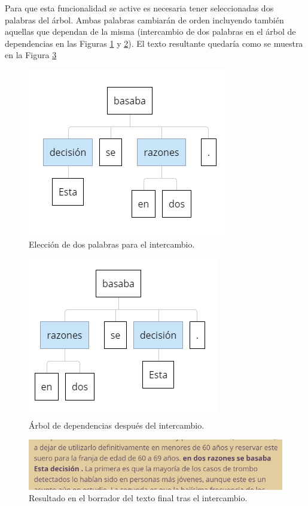 Para que esta funcionalidad se active es necesaria tener seleccionadas dos palabras del árbol. Ambas palabras cambiarán de orden incluyendo también aquellas que dependan de la misma (intercambio de dos palabras en el árbol de dependencias en las Figuras \ref{fig:eleccionIntercambio} y \ref{fig:intercambio}). El texto resultante quedaría como se muestra en la Figura \ref{fig:borradorIntercambio}
\begin{figure}[h!]
	\centering
	
	
	\includegraphics[scale=1]{Imagenes/Figuras/EleccionIntercambio}
	
	
	\caption{Elección de dos palabras para el intercambio.}
	\label{fig:eleccionIntercambio}
\end{figure}
\begin{figure}[h!]
	\centering
	
	
	\includegraphics[scale=1]{Imagenes/Figuras/IntercambioArbol}
	
	
	\caption{Árbol de dependencias después del intercambio.}
	\label{fig:intercambio}
\end{figure}
\begin{figure}[h!]
	\centering
	
	
	\includegraphics[scale=1]{Imagenes/Figuras/BorradorIntercambio}
	
	
	\caption{Resultado en el borrador del texto final tras el intercambio.}
	\label{fig:borradorIntercambio}
\end{figure}
